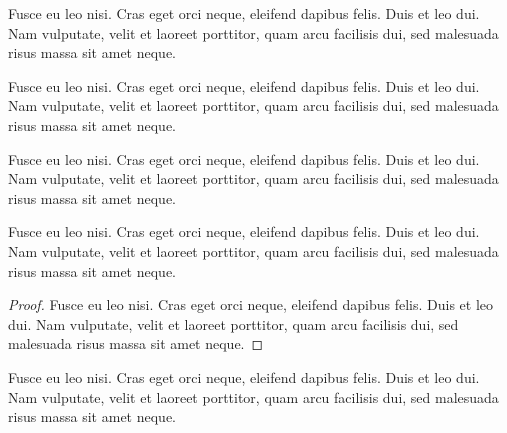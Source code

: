 \documentclass[a4paper,UKenglish,cleveref, autoref, thm-restate]{lipics-v2021}
\begin{document}
\begin{remark}\label{testenv-remark}
Fusce eu leo nisi. Cras eget orci neque, eleifend dapibus felis. Duis et leo dui. Nam vulputate, velit et laoreet porttitor, quam arcu facilisis dui, sed malesuada risus massa sit amet neque.
\end{remark}

\begin{remark*}
Fusce eu leo nisi. Cras eget orci neque, eleifend dapibus felis. Duis et leo dui. Nam vulputate, velit et laoreet porttitor, quam arcu facilisis dui, sed malesuada risus massa sit amet neque.
\end{remark*}

\begin{claim}\label{testenv-claim}
Fusce eu leo nisi. Cras eget orci neque, eleifend dapibus felis. Duis et leo dui. Nam vulputate, velit et laoreet porttitor, quam arcu facilisis dui, sed malesuada risus massa sit amet neque.
\end{claim}

\begin{claim*}\label{testenv-claim2}
Fusce eu leo nisi. Cras eget orci neque, eleifend dapibus felis. Duis et leo dui. Nam vulputate, velit et laoreet porttitor, quam arcu facilisis dui, sed malesuada risus massa sit amet neque.
\end{claim*}

\begin{proof}
Fusce eu leo nisi. Cras eget orci neque, eleifend dapibus felis. Duis et leo dui. Nam vulputate, velit et laoreet porttitor, quam arcu facilisis dui, sed malesuada risus massa sit amet neque.
\end{proof}

\begin{claimproof}
Fusce eu leo nisi. Cras eget orci neque, eleifend dapibus felis. Duis et leo dui. Nam vulputate, velit et laoreet porttitor, quam arcu facilisis dui, sed malesuada risus massa sit amet neque.
\end{claimproof}
\end{document}
